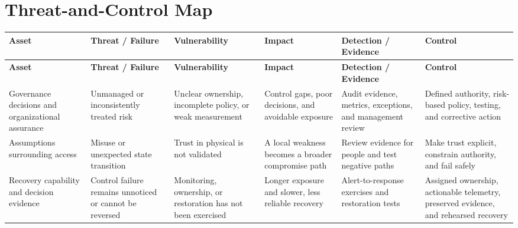 \documentclass[11pt]{article}
\begin{document}
\section*{Threat-and-Control Map}
\begingroup\scriptsize\setlength{\tabcolsep}{2pt}
\begin{longtable}{>{\RaggedRight\arraybackslash}p{}>{\RaggedRight\arraybackslash}p{}>{\RaggedRight\arraybackslash}p{}>{\RaggedRight\arraybackslash}p{}>{\RaggedRight\arraybackslash}p{}>{\RaggedRight\arraybackslash}p{}}
\toprule\rowcolor{Navy}\color{white}\textbf{Asset} & \color{white}\textbf{Threat / Failure} & \color{white}\textbf{Vulnerability} & \color{white}\textbf{Impact} & \color{white}\textbf{Detection / Evidence} & \color{white}\textbf{Control}\\\midrule
\endfirsthead
\toprule\rowcolor{Navy}\color{white}\textbf{Asset} & \color{white}\textbf{Threat / Failure} & \color{white}\textbf{Vulnerability} & \color{white}\textbf{Impact} & \color{white}\textbf{Detection / Evidence} & \color{white}\textbf{Control}\\\midrule
\endhead
Governance decisions and organizational assurance & Unmanaged or inconsistently treated risk & Unclear ownership, incomplete policy, or weak measurement & Control gaps, poor decisions, and avoidable exposure & Audit evidence, metrics, exceptions, and management review & Defined authority, risk-based policy, testing, and corrective action\\\midrule
Assumptions surrounding access & Misuse or unexpected state transition & Trust in physical is not validated & A local weakness becomes a broader compromise path & Review evidence for people and test negative paths & Make trust explicit, constrain authority, and fail safely\\\midrule
Recovery capability and decision evidence & Control failure remains unnoticed or cannot be reversed & Monitoring, ownership, or restoration has not been exercised & Longer exposure and slower, less reliable recovery & Alert-to-response exercises and restoration tests & Assigned ownership, actionable telemetry, preserved evidence, and rehearsed recovery\\\midrule
\bottomrule
\end{longtable}
\endgroup
\end{document}
